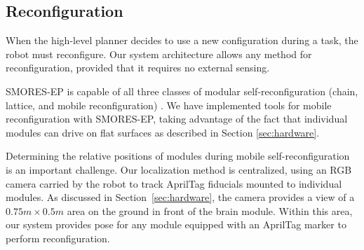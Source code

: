 \documentclass[conference]{IEEEtran}
\newcommand{\TODO}[1]{ {\bf \textcolor{red}{TODO:} #1 }}
\begin{document}
\subsection{Reconfiguration}
\label{sec:reconfiguration}
%
When the high-level planner decides to use a new configuration during a task, the robot must reconfigure. Our system architecture allows any method for reconfiguration, provided that it requires no external sensing.  

SMORES-EP is capable of all three classes of modular self-reconfiguration (chain, lattice, and mobile reconfiguration) \cite{Davey2012,yim2003modular}.  We have implemented tools for mobile reconfiguration with SMORES-EP, taking advantage of the fact that individual modules can drive on flat surfaces as described in Section \ref{sec:hardware}.

Determining the relative positions of modules during mobile self-reconfiguration is an important challenge. 
Our localization method is centralized, using an RGB camera carried by the robot to track AprilTag fiducials mounted to individual modules.  As discussed in Section~\ref{sec:hardware}, the camera provides a view of a $0.75m\times0.5m$ area on the ground in front of the brain module.  
Within this area, our system provides pose for any module equipped with an AprilTag marker to perform reconfiguration. 
\end{document}
